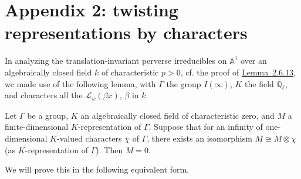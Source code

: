 \section{Appendix 2: twisting representations by characters}\label{sec:2.18}

In analyzing the translation-invariant perverse irreducibles on
\(\mathbb{A}^1\) over an algebraically closed field \(k\) of characteristic
\(p>0\), cf. the proof of \hyperref[lem:2.6.13]{Lemma~2.6.13}, we made use of
the following lemma, with \(\Gamma\) the group \(I(\infty)\), \(K\) the field
\(\overline{\mathbb{Q}}_\ell\), and characters all the
\(\mathcal{L}_\psi(\beta x)\), \(\beta\) in \(k\).

Let \(\Gamma\) be a group, \(K\) an algebraically closed field of
characteristic zero, and \(M\) a finite-dimensional \(K\)-representation of
\(\Gamma\). Suppose that for an infinity of one-dimensional \(K\)-valued
characters \(\chi\) of \(\Gamma\), there exists an isomorphism
\(M\cong M\otimes\chi\) (as \(K\)-representation of \(\Gamma\)). Then \(M=0\).

We will prove this in the following equivalent form.

